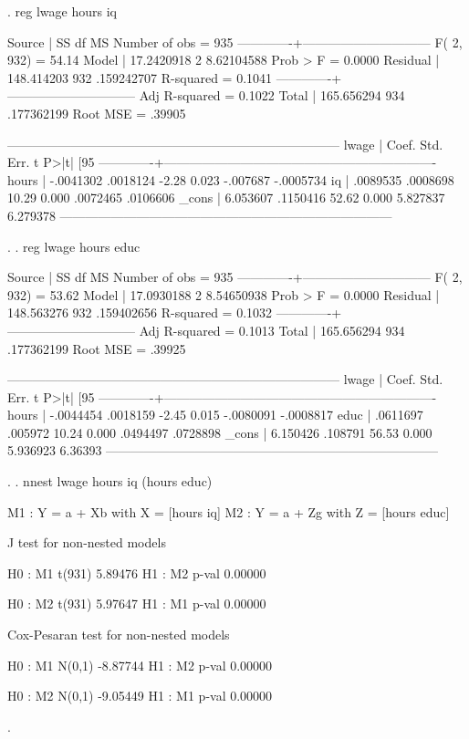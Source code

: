 \documentclass[12pt]{article}
\begin{document}
\begin{stlog}
  
. reg lwage hours iq

      Source |       SS       df       MS              Number of obs =     935
-------------+------------------------------           F(  2,   932) =   54.14
       Model |  17.2420918     2  8.62104588           Prob > F      =  0.0000
    Residual |  148.414203   932  .159242707           R-squared     =  0.1041
-------------+------------------------------           Adj R-squared =  0.1022
       Total |  165.656294   934  .177362199           Root MSE      =  .39905

------------------------------------------------------------------------------
       lwage |      Coef.   Std. Err.      t    P>|t|     [95%
-------------+----------------------------------------------------------------
       hours |  -.0041302   .0018124    -2.28   0.023     -.007687   -.0005734
          iq |   .0089535   .0008698    10.29   0.000     .0072465    .0106606
       _cons |   6.053607   .1150416    52.62   0.000     5.827837    6.279378
------------------------------------------------------------------------------

. 
. reg lwage hours educ

      Source |       SS       df       MS              Number of obs =     935
-------------+------------------------------           F(  2,   932) =   53.62
       Model |  17.0930188     2  8.54650938           Prob > F      =  0.0000
    Residual |  148.563276   932  .159402656           R-squared     =  0.1032
-------------+------------------------------           Adj R-squared =  0.1013
       Total |  165.656294   934  .177362199           Root MSE      =  .39925

------------------------------------------------------------------------------
       lwage |      Coef.   Std. Err.      t    P>|t|     [95%
-------------+----------------------------------------------------------------
       hours |  -.0044454   .0018159    -2.45   0.015    -.0080091   -.0008817
        educ |   .0611697    .005972    10.24   0.000     .0494497    .0728898
       _cons |   6.150426    .108791    56.53   0.000     5.936923     6.36393
------------------------------------------------------------------------------

. 
. nnest lwage hours iq (hours educ)

M1 : Y = a + Xb with X = [hours iq]
M2 : Y = a + Zg with Z = [hours educ]

J test for non-nested models

H0 : M1  t(931)      5.89476
H1 : M2  p-val       0.00000

H0 : M2  t(931)      5.97647
H1 : M1  p-val       0.00000

Cox-Pesaran test for non-nested models

H0 : M1  N(0,1)     -8.87744
H1 : M2  p-val       0.00000

H0 : M2  N(0,1)     -9.05449
H1 : M1  p-val       0.00000

. 
\end{stlog}
\end{document}
